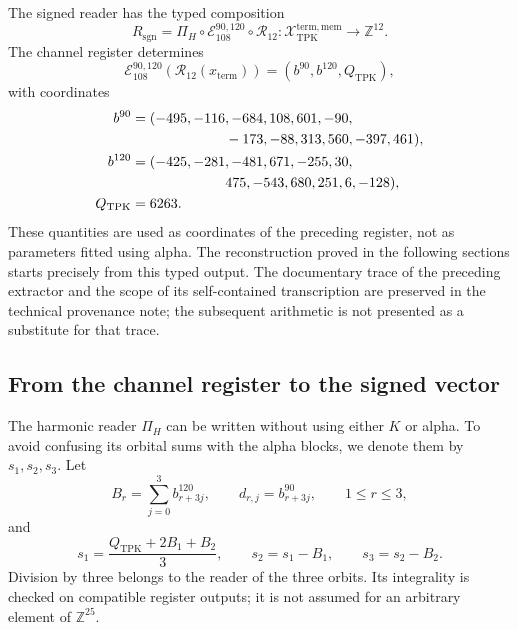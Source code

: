 The signed reader has the typed composition
\begin{equation}
 R_{\mathrm{sgn}}
 =\Pi_H\circ\mathcal E_{108}^{90,120}\circ\mathcal R_{12}:
 \mathcal X_{\mathrm{TPK}}^{\mathrm{term,mem}}
 \longrightarrow\mathbb Z^{12}.
 \label{eq:k-lector-firmado}
\end{equation}
The channel register determines
\[
 \mathcal E_{108}^{90,120}(\mathcal R_{12}(x_{\mathrm{term}}))
 =(b^{90},b^{120},Q_{\mathrm{TPK}}),
\]
with coordinates
\begin{align*}
 b^{90}={}&(-495,-116,-684,108,601,-90,\\
            &\hspace{19mm}-173,-88,313,560,-397,461),\\
 b^{120}={}&(-425,-281,-481,671,-255,30,\\
             &\hspace{19mm}475,-543,680,251,6,-128),\\
 Q_{\mathrm{TPK}}={}&6263.
\end{align*}
These quantities are used as coordinates of the preceding register, not
as parameters fitted using alpha. The reconstruction proved
in the following sections starts precisely from this typed output.
The documentary trace of the preceding extractor and the scope of its self-contained
transcription are preserved in the technical provenance note; the subsequent
arithmetic is not presented as a substitute for that trace.

\subsection{From the channel register to the signed vector}
\label{subsec:k-pi-h}

The harmonic reader \(\Pi_H\) can be written without using either \(K\) or
alpha. To avoid confusing its orbital sums with the alpha blocks,
we denote them by \(s_1,s_2,s_3\). Let
\[
 B_r=\sum_{j=0}^{3}b^{120}_{r+3j},\qquad
 d_{r,j}=b^{90}_{r+3j},\qquad1\leq r\leq3,
\]
and
\begin{equation}
 s_1=\frac{Q_{\mathrm{TPK}}+2B_1+B_2}{3},\qquad
 s_2=s_1-B_1,\qquad s_3=s_2-B_2.
 \label{eq:k-sumas-armonicas}
\end{equation}
Division by three belongs to the reader of the three orbits. Its
integrality is checked on compatible register outputs; it
is not assumed for an arbitrary element of \(\mathbb Z^{25}\).

